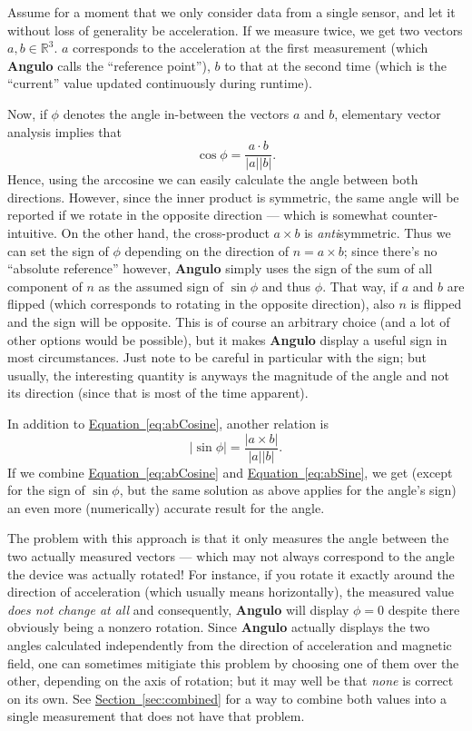 \documentclass{article}
\newcommand{\abs}[1]{\ensuremath{\left| #1 \right|}}
\newcommand{\inner}[2]{\ensuremath{#1 \cdot #2}}
\newcommand{\cross}[2]{\ensuremath{#1 \times #2}}
\newcommand{\R}[0]{\ensuremath{\mathbb{R}}}
\newcommand{\Rthree}[0]{\ensuremath{\R^3}}
\renewcommand{\eqref}[1]{\hyperref[eq:#1]{Equation~\ref*{eq:#1}}}
\newcommand{\secref}[1]{\hyperref[sec:#1]{Section~\ref*{sec:#1}}}
\newcommand{\Angulo}[0]{\textbf{Angulo} }
\begin{document}
Assume for a moment that we only consider data from a single sensor, and let
it without loss of generality be acceleration.  If we
measure twice, we get two vectors $a, b \in \Rthree$.  $a$ corresponds to
the acceleration at the first measurement (which \Angulo calls the
``reference point''), $b$ to that at the second time (which is the ``current''
value updated continuously during runtime).

Now, if $\phi$ denotes the angle in-between the vectors $a$ and $b$,
elementary vector analysis implies that
\begin{equation}
\label{eq:abCosine}
\cos \phi = \frac{\inner{a}b}{\abs{a} \abs{b}}.
\end{equation}
Hence, using the arccosine we can easily calculate the angle between both
directions.  However, since the inner product is symmetric, the same angle
will be reported if we rotate in the opposite direction --- which is somewhat
counter-intuitive.  On the other hand, the cross-product $\cross{a}b$ is
\emph{anti}symmetric.  Thus we can set the sign of $\phi$ depending on the
direction of $n = \cross{a}b$; since there's no ``absolute reference'' however,
\Angulo simply uses the sign of the sum of all component of $n$ as the
assumed sign of $\sin \phi$ and thus $\phi$.
That way, if $a$ and $b$ are flipped (which corresponds to rotating in the
opposite direction), also $n$ is flipped and the sign will be opposite.  This
is of course an arbitrary choice (and a lot of other options would be possible),
but it makes \Angulo display a useful sign in most circumstances.  Just note
to be careful in particular with the sign; but usually, the interesting
quantity is anyways the magnitude of the angle and not its direction (since that
is most of the time apparent).

In addition to \eqref{abCosine}, another relation is
\begin{equation}
\label{eq:abSine}
\abs{\sin \phi} = \frac{\abs{\cross{a}b}}{\abs{a} \abs{b}}.
\end{equation}
If we combine \eqref{abCosine} and \eqref{abSine}, we get (except for
the sign of $\sin \phi$, but the same solution as above applies for the
angle's sign) an even more (numerically) accurate result for the angle.

The problem with this approach is that it only measures the angle between
the two actually measured vectors --- which may not always correspond to the
angle the device was actually rotated!  For instance, if you rotate it exactly
around the direction of acceleration (which usually means horizontally), the
measured value \emph{does not change at all} and consequently, \Angulo will
display $\phi = 0$ despite there obviously being a nonzero rotation.  Since
\Angulo actually displays the two angles calculated independently from
the direction of acceleration and magnetic field, one can sometimes mitigiate
this problem by choosing one of them over the other, depending on the axis
of rotation; but it may well be that \emph{none} is correct on its own.
See \secref{combined} for a way to combine both values into a single
measurement that does not have that problem.
\end{document}
